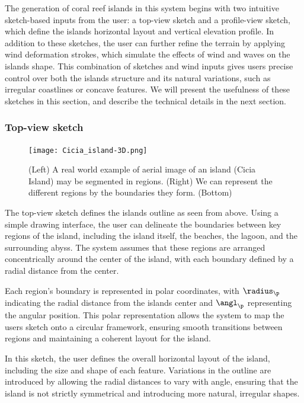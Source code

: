 The generation of coral reef islands in this system begins with two intuitive sketch-based inputs from the user: a top-view sketch and a profile-view sketch, which define the islands horizontal layout and vertical elevation profile. In addition to these sketches, the user can further refine the terrain by applying wind deformation strokes, which simulate the effects of wind and waves on the islands shape. This combination of sketches and wind inputs gives users precise control over both the islands structure and its natural variations, such as irregular coastlines or concave features. We will present the usefulness of these sketches in this section, and describe the technical details in the next section.

\subsubsection{Top-view sketch}

\begin{figure}[H]
	\centering
	\texttt{[image: Cicia\_island-3D.png]}
    \caption{(Left) A real world example of aerial image of an island (Cicia Island) may be segmented in regions. (Right) We can represent the different regions by the boundaries they form. (Bottom)  }
    \label{fig:coral-island_top-view-sketch}
\end{figure}

The top-view sketch defines the islands outline as seen from above. Using a simple drawing interface, the user can delineate the boundaries between key regions of the island, including the island itself, the beaches, the lagoon, and the surrounding abyss. The system assumes that these regions are arranged concentrically around the center of the island, with each boundary defined by a radial distance from the center.

Each region's boundary is represented in polar coordinates, with $\radius_\p$ indicating the radial distance from the islands center and $\angl_\p$ representing the angular position. This polar representation allows the system to map the users sketch onto a circular framework, ensuring smooth transitions between regions and maintaining a coherent layout for the island.

In this sketch, the user defines the overall horizontal layout of the island, including the size and shape of each feature. Variations in the outline are introduced by allowing the radial distances to vary with angle, ensuring that the island is not strictly symmetrical and introducing more natural, irregular shapes.

